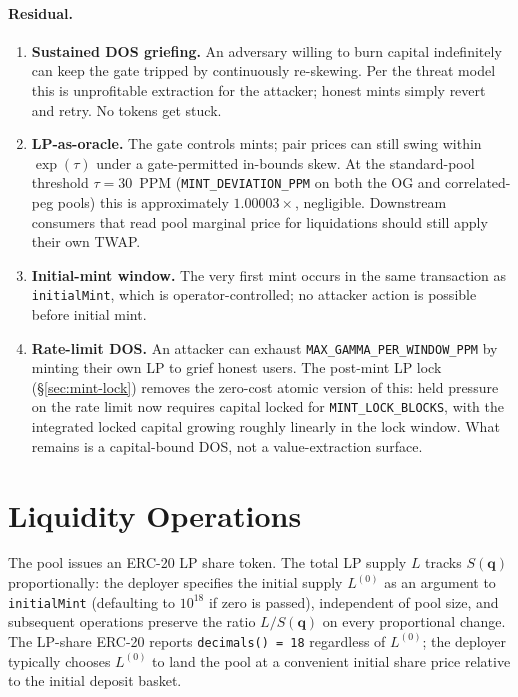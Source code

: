 \documentclass[11pt]{article}
\newcommand{\Sm}{S(\mathbf{q})}
\begin{document}
\paragraph{Residual.}
\begin{enumerate}
  \item \textbf{Sustained DOS griefing.} An adversary willing to burn
        capital indefinitely can keep the gate tripped by continuously
        re-skewing. Per the threat model this is unprofitable
        extraction for the attacker; honest mints simply revert and
        retry. No tokens get stuck.
  \item \textbf{LP-as-oracle.} The gate controls mints; pair prices
        can still swing within $\exp(\tau)$ under a gate-permitted
        in-bounds skew. At the standard-pool threshold $\tau =
        30$~PPM (\texttt{MINT\_DEVIATION\_PPM} on both the OG and
        correlated-peg pools) this is approximately $1.00003\times$,
        negligible. Downstream consumers that read pool marginal price
        for liquidations should still apply their own TWAP.
  \item \textbf{Initial-mint window.} The very first mint occurs in
        the same transaction as \texttt{initialMint}, which is
        operator-controlled; no attacker action is possible before
        initial mint.
  \item \textbf{Rate-limit DOS.} An attacker can exhaust
        \texttt{MAX\_GAMMA\_PER\_WINDOW\_PPM} by minting their own LP
        to grief honest users. The post-mint LP lock
        (\S\ref{sec:mint-lock}) removes the zero-cost atomic version of
        this: held pressure on the rate limit now requires capital
        locked for \texttt{MINT\_LOCK\_BLOCKS}, with the integrated
        locked capital growing roughly linearly in the lock window.
        What remains is a capital-bound DOS, not a value-extraction
        surface.
\end{enumerate}

\section{Liquidity Operations}
\label{sec:liquidity}

The pool issues an ERC-20 LP share token. The total LP supply $L$ tracks
$\Sm$ proportionally: the deployer specifies the initial supply $L^{(0)}$
as an argument to \texttt{initialMint} (defaulting to $10^{18}$ if zero is
passed), independent of pool size, and subsequent operations preserve the
ratio $L / \Sm$ on every proportional change. The LP-share ERC-20 reports
\texttt{decimals() = 18} regardless of $L^{(0)}$; the deployer typically
chooses $L^{(0)}$ to land the pool at a convenient initial share price
relative to the initial deposit basket.
\end{document}
